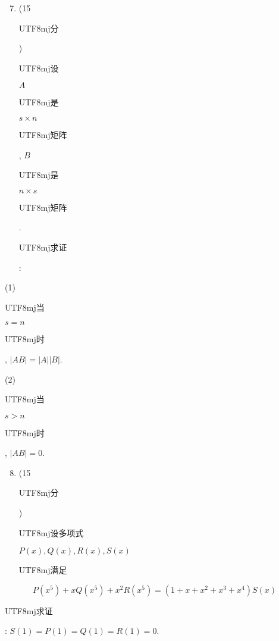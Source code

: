 \documentclass[10pt]{article}
\begin{document}
\begin{enumerate}
  \setcounter{enumi}{6}
  \item (15 \begin{CJK}{UTF8}{mj}分\end{CJK}) \begin{CJK}{UTF8}{mj}设\end{CJK} $A$ \begin{CJK}{UTF8}{mj}是\end{CJK} $s \times n$ \begin{CJK}{UTF8}{mj}矩阵\end{CJK}, $B$ \begin{CJK}{UTF8}{mj}是\end{CJK} $n \times s$ \begin{CJK}{UTF8}{mj}矩阵\end{CJK}. \begin{CJK}{UTF8}{mj}求证\end{CJK}:
\end{enumerate}
(1) \begin{CJK}{UTF8}{mj}当\end{CJK} $s=n$ \begin{CJK}{UTF8}{mj}时\end{CJK}, $|A B|=|A||B|$.

(2) \begin{CJK}{UTF8}{mj}当\end{CJK} $s>n$ \begin{CJK}{UTF8}{mj}时\end{CJK}, $|A B|=0$.

\begin{enumerate}
  \setcounter{enumi}{7}
  \item (15 \begin{CJK}{UTF8}{mj}分\end{CJK}) \begin{CJK}{UTF8}{mj}设多项式\end{CJK} $P(x), Q(x), R(x), S(x)$ \begin{CJK}{UTF8}{mj}满足\end{CJK}
\end{enumerate}
$$
P\left(x^{5}\right)+x Q\left(x^{5}\right)+x^{2} R\left(x^{5}\right)=\left(1+x+x^{2}+x^{3}+x^{4}\right) S(x)
$$
\begin{CJK}{UTF8}{mj}求证\end{CJK}: $S(1)=P(1)=Q(1)=R(1)=0$.
\end{document}
